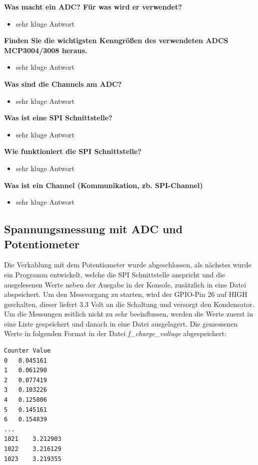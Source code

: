 \documentclass{article}
\begin{document}
\textbf{Was macht ein ADC? Für was wird er verwendet?}
\begin{itemize}
    \item sehr kluge Antwort
\end{itemize}
\textbf{Finden Sie die wichtigsten Kenngrößen des verwendeten ADCS MCP3004/3008 heraus.}
\begin{itemize}
    \item sehr kluge Antwort
\end{itemize}
\textbf{Was sind die Channels am ADC?}
\begin{itemize}
    \item sehr kluge Antwort
\end{itemize}
\textbf{Was ist eine SPI Schnittstelle?}
\begin{itemize}
    \item sehr kluge Antwort
\end{itemize}
\textbf{Wie funktioniert die SPI Schnittstelle?}
\begin{itemize}
    \item sehr kluge Antwort
\end{itemize}
\textbf{Was ist ein Channel (Kommunikation, zb. SPI-Channel)}
\begin{itemize}
    \item sehr kluge Antwort
\end{itemize}

\newpage

\subsection{Spannungsmessung mit ADC und Potentiometer}
Die Verkablung mit dem Potentiometer wurde abgeschlossen, als nächstes wurde ein Programm entwickelt,
welche die SPI Schnittstelle anspricht und die ausgelesenen Werte neben der Ausgabe in der Konsole, zusätzlich in eine Datei abspeichert.
Um den Messvorgang zu starten, wird der GPIO-Pin 26 auf HIGH geschalten, dieser liefert 3.3 Volt an die Schaltung und versorgt den Kondensator.\\
Um die Messungen zeitlich nicht zu sehr beeinflussen, werden die Werte zuerst in eine Liste gespeichert und danach in eine Datei ausgelagert.
Die gemessenen Werte in folgenden Format in der Datei \textit{f\_charge\_voltage} abgespeichert:

\begin{lstlisting}
Counter Value
0	0.045161
1	0.061290
2	0.077419
3	0.103226
4	0.125806
5	0.145161
6	0.154839
...
1021	3.212903
1022	3.216129
1023	3.219355
\end{lstlisting}
\end{document}
